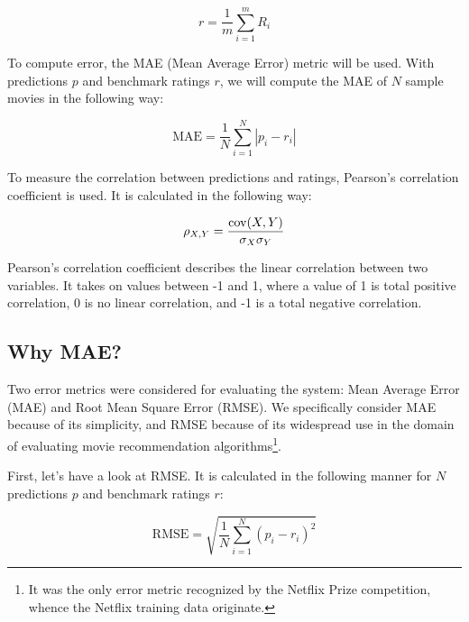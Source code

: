 \begin{equation}
  r = \frac{1}{m} \sum_{i=1}^m R_i
\end{equation}

To compute error, the MAE (Mean Average Error) metric will be used. With predictions $p$ and benchmark ratings $r$, we will compute the MAE of $N$ sample movies in the following way:

\begin{equation}
  \text{MAE} = \frac{1}{N} \sum_{i=1}^N |p_i - r_i|
  \label{eq:mae}
\end{equation}

% 

To measure the correlation between predictions and ratings, Pearson's correlation coefficient is used. It is calculated in the following way:

\begin{equation}
  \rho_{X,Y} = \frac{\operatorname{cov}(X, Y)}{\sigma_X \sigma_Y}
\end{equation}

Pearson's correlation coefficient describes the linear correlation between two variables. It takes on values between -1 and 1, where a value of 1 is total positive correlation, 0 is no linear correlation, and -1 is a total negative correlation.

\subsection{Why MAE?} %
\label{sub:why_mae}

Two error metrics were considered for evaluating the system: Mean Average Error (MAE) and Root Mean Square Error (RMSE). We specifically consider MAE because of its simplicity, and RMSE because of its widespread use in the domain of evaluating movie recommendation algorithms\footnote{It was the only error metric recognized by the Netflix Prize competition, whence the Netflix training data originate.}.

First, let's have a look at RMSE. It is calculated in the following manner for $N$ predictions $p$ and benchmark ratings $r$:

\begin{equation}
  \text{RMSE} = \sqrt{ \frac{1}{N} \sum_{i=1}^N (p_i - r_i)^2 }
\end{equation}


